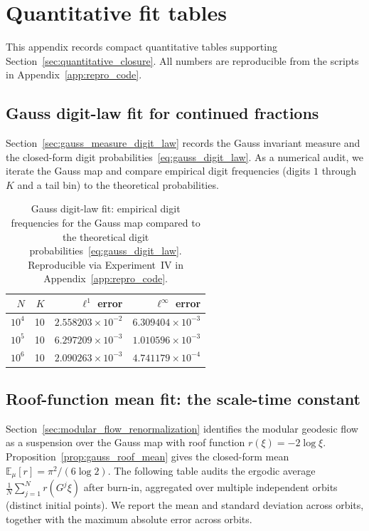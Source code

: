 
\section{Quantitative fit tables}
\label{app:quant_fits}

This appendix records compact quantitative tables supporting Section~\ref{sec:quantitative_closure}. All numbers are reproducible from the scripts in Appendix~\ref{app:repro_code}.

\subsection{Gauss digit-law fit for continued fractions}
\label{app:quant_fits_gauss_digits}

Section~\ref{sec:gauss_measure_digit_law} records the Gauss invariant measure and the closed-form digit probabilities~\eqref{eq:gauss_digit_law}. As a numerical audit, we iterate the Gauss map and compare empirical digit frequencies (digits $1$ through $K$ and a tail bin) to the theoretical probabilities.

\begin{table}[H]
\centering
\begin{tabular}{rrrr}
\toprule
$N$ & $K$ & $\ell^1$ error & $\ell^\infty$ error \\
\midrule
$10^4$   & 10 & $2.558203\times 10^{-2}$ & $6.309404\times 10^{-3}$ \\
$10^5$   & 10 & $6.297209\times 10^{-3}$ & $1.010596\times 10^{-3}$ \\
$10^6$   & 10 & $2.090263\times 10^{-3}$ & $4.741179\times 10^{-4}$ \\
\bottomrule
\end{tabular}
\caption{Gauss digit-law fit: empirical digit frequencies for the Gauss map compared to the theoretical digit probabilities~\eqref{eq:gauss_digit_law}. Reproducible via Experiment~IV in Appendix~\ref{app:repro_code}.}
\label{tab:gauss_digit_fit}
\end{table}

\subsection{Roof-function mean fit: the scale-time constant}
\label{app:quant_fits_roof_mean}

Section~\ref{sec:modular_flow_renormalization} identifies the modular geodesic flow as a suspension over the Gauss map with roof function $r(\xi)=-2\log\xi$. Proposition~\ref{prop:gauss_roof_mean} gives the closed-form mean $\mathbb{E}_\mu[r]=\pi^2/(6\log 2)$. The following table audits the ergodic average $\frac{1}{N}\sum_{j=1}^{N} r(G^j\xi)$ after burn-in, aggregated over multiple independent orbits (distinct initial points). We report the mean and standard deviation across orbits, together with the maximum absolute error across orbits.

